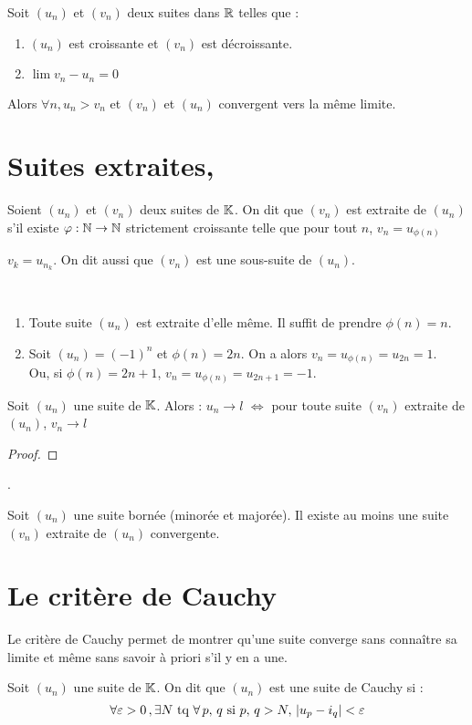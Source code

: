 Soit $(u_n)$ et $(v_n)$ deux suites dans $\mathbb{R}$ telles que :
\begin{enumerate}
	\item $(u_n)$ est croissante et $(v_n)$ est décroissante.
	\item $\lim v_n-u_n = 0$
\end{enumerate}
Alors $\forall n, u_n >v_n$ et $(v_n)$ et $(u_n)$ convergent vers la même limite.

\section{Suites extraites, \BW}
Soient $(u_n)$ et $(v_n)$ deux suites de $\mathbb{K}$. On dit que $(v_n)$ est extraite de $(u_n)$ s'il existe $\varphi : \mathbb{N}\to\mathbb{N}$ strictement croissante telle que pour tout $n$, $v_n = u_{\phi(n)}$

\nota
$v_k =u_{n_k}$. On dit aussi que $(v_n)$ est une sous-suite de $(u_n)$.

\rem
~
\begin{enumerate}
	\item Toute suite $(u_n)$ est extraite d'elle même. Il suffit de prendre $\phi(n)=n$.
	\item Soit $(u_n) = (-1)^n$ et $\phi(n)=2n$. On a alors $v_n=u_{\phi(n)} = u_{2n} = 1$.\\Ou, si $\phi(n)=2n+1$, $v_n=u_{\phi(n)} = u_{2n+1} = -1$. 
\end{enumerate}

\lem Soit $(u_n)$ une suite de $\mathbb{K}$. Alors : $u_n\to l$ $\Leftrightarrow$ pour toute suite $(v_n)$ extraite de $(u_n)$, $v_n\to l$

\begin{proof}\end{proof} .

\thm[Théorème de \BW]
Soit $(u_n)$ une suite bornée (minorée et majorée). Il existe au moins une suite $(v_n)$ extraite de $(u_n)$ convergente.

\section{Le critère de Cauchy}
\inter
Le critère de Cauchy permet de montrer qu'une suite converge sans connaître sa limite et même sans savoir à priori s'il y en a une.

Soit $(u_n)$ une suite de $\mathbb{K}$. On dit que $(u_n)$ est une suite de Cauchy si :
$$\forall \varepsilon>0\,,\exists N\text{~tq~}\forall\, p,\,q \text{~si~} p,\,q>N,\,|u_p-i_q|<\varepsilon$$

